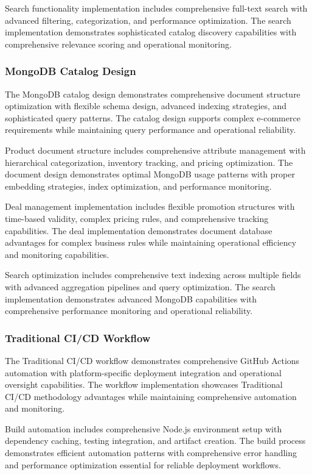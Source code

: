 Search functionality implementation includes comprehensive full-text search with advanced filtering, categorization, and performance optimization. The search implementation demonstrates sophisticated catalog discovery capabilities with comprehensive relevance scoring and operational monitoring.

\subsubsection{MongoDB Catalog Design}

The MongoDB catalog design demonstrates comprehensive document structure optimization with flexible schema design, advanced indexing strategies, and sophisticated query patterns. The catalog design supports complex e-commerce requirements while maintaining query performance and operational reliability.

Product document structure includes comprehensive attribute management with hierarchical categorization, inventory tracking, and pricing optimization. The document design demonstrates optimal MongoDB usage patterns with proper embedding strategies, index optimization, and performance monitoring.

Deal management implementation includes flexible promotion structures with time-based validity, complex pricing rules, and comprehensive tracking capabilities. The deal implementation demonstrates document database advantages for complex business rules while maintaining operational efficiency and monitoring capabilities.

Search optimization includes comprehensive text indexing across multiple fields with advanced aggregation pipelines and query optimization. The search implementation demonstrates advanced MongoDB capabilities with comprehensive performance monitoring and operational reliability.

\subsubsection{Traditional CI/CD Workflow}

The Traditional CI/CD workflow demonstrates comprehensive GitHub Actions automation with platform-specific deployment integration and operational oversight capabilities. The workflow implementation showcases Traditional CI/CD methodology advantages while maintaining comprehensive automation and monitoring.

Build automation includes comprehensive Node.js environment setup with dependency caching, testing integration, and artifact creation. The build process demonstrates efficient automation patterns with comprehensive error handling and performance optimization essential for reliable deployment workflows.

